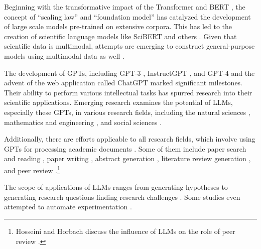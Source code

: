\documentclass{article}
\begin{document}
Beginning with the transformative impact of the Transformer \cite{vaswani2017attention} and BERT \cite{devlin2018bert}, the concept of ``scaling law'' \cite{kaplan2020scaling} and ``foundation model'' \cite{bommasani2021opportunities} has catalyzed the development of large scale models pre-trained on extensive corpora. This has led to the creation of scientific language models like SciBERT \cite{beltagy2019scibert} and others \cite{cohan2020specter,singh2022scirepeval,nadkarni2021scientific,gupta2022matscibert,taylor2022galactica,azerbayev2023llemma,xie2023darwin,luo2022biogpt,yang2022gatortron,deng2023learning}. Given that scientific data is multimodal, attempts are emerging to construct general-purpose models using multimodal data as well \cite{li2023llava,tu2023towards,takeda2023foundation,nguyen2023climax}.

The development of GPTs, including GPT-3 \cite{brown2020language}, InstructGPT \cite{ouyang2022training}, and GPT-4 \cite{GPT4} and the advent of the web application called ChatGPT  \cite{ChatGPT} marked significant milestones. Their ability to perform various intellectual tasks has spurred research into their scientific applications. Emerging research examines the potential of LLMs, especially these GPTs, in various research fields, including the natural sciences \cite{ai4science2023impact,boiko2023emergent,qin2023gpt,bran2023chemcrow,white2022large,hatakeyama2023prompt,jablonka202314,guo2023can,zheng2023large,qian2023can,wysocka2023large,nori2023capabilities,wang2023large,singhal2023large}, mathematics and engineering \cite{bordt2023chatgpt,wu2023empirical,pursnani2023performance,zheng2023can,zhang2023automl,vijay2023prompt,huang2023benchmarking}, and social sciences \cite{koneru2023can,wang2023survey,bail2023can,ziems2023can,park2023generative,horton2023large,korinek2023generative,aher2023using}.

Additionally, there are efforts applicable to all research fields, which involve using GPTs for processing academic documents \cite{alzaabi2023chatgpt}. Some of them include paper search and reading \cite{elicit,scispace}, paper writing \cite{transformer2022can}, abstract generation \cite{gao2023comparing}, literature review generation \cite{aydin2022openai}, and peer review \cite{wexin2023can,liu2023reviewergpt,robertson2023gpt4}.\footnote{
Hosseini and Horbach discuss the influence of LLMs on the role of peer review \cite{hosseini2023fighting}.
}

The scope of applications of LLMs ranges from generating hypotheses to generating research questions finding research challenges \cite{liu2023creative,oppenlaender2023mapping,lahat2023evaluating}. Some studies even attempted to automate experimentation \cite{boiko2023emergent,qin2023gpt}. 
\end{document}
